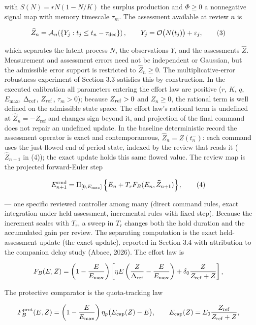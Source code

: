 \documentclass[11pt]{article}
\begin{document}
with \(S(N)=rN(1-N/K)\) the surplus production and \(\Phi\ge 0\) a
nonnegative signal map with memory timescale \(\tau_m\). The assessment
available at review \(n\) is

\[
\widehat Z_n=\mathcal A_n\!\left(\{Y_j:t_j\le t_n-\tau_{\rm dec}\}\right),\qquad
Y_j=\mathcal O\bigl(N(t_j)\bigr)+\varepsilon_j,
\tag{3}
\]

which separates the latent process \(N\), the observations \(Y\), and
the assessments \(\widehat Z\). Measurement and assessment errors need
not be independent or Gaussian, but the admissible error support is
restricted to \(\widehat Z_n \ge 0\). The multiplicative-error
robustness experiment of Section 3.3 satisfies this by construction. In the executed calibration all parameters entering the effort law are positive (\(r\), \(K\), \(q\), \(E_{\max}\), \(\Delta_{\rm ref}\), \(Z_{\rm ref}\), \(\tau_m > 0\)); because \(Z_{\rm ref} > 0\) and \(\widehat Z_n \ge 0\), the rational term is well defined on the admissible state space. The effort law's rational term is undefined at
\(\widehat Z_n = -Z_{\mathrm{ref}}\) and changes sign beyond it, and
projection of the final command does not repair an undefined update. In
the baseline deterministic record the assessment operator is exact and
contemporaneous, \(\widehat Z_n = Z(t_n^-)\): each command uses the just-flowed end-of-period state, indexed by the review that reads it (\(\widehat Z_{n+1}\) in (4)); the exact update holds this same flowed value. The review map is the
projected forward-Euler step

\[
E^{\rm cmd}_{n+1}=\Pi_{[0,E_{\max}]}\left\{E_n+T_rF_B(E_n,\widehat Z_{n+1})\right\},
\tag{4}
\]

--- one specific reviewed controller among many (direct command rules,
exact integration under held assessment, incremental rules with fixed
step). Because the increment scales with \(T_r\), a sweep in \(T_r\)
changes both the hold duration and the accumulated gain per review. The
separating computation is the exact held-assessment update (the exact update), reported in
Section 3.4 with attribution to the companion delay study (Abaee, 2026). The effort law is

\[
F_B(E,Z)=\left(1-\frac{E}{E_{\max}}\right)
\left[
\eta E\left(\frac{Z}{\Delta_{\rm ref}}-\frac{E}{E_{\max}}\right)
+\delta_0\frac{Z}{Z_{\rm ref}+Z}
\right],
\]

The protective comparator is the quota-tracking law

\[
F_B^{\rm prot}(E,Z)=\left(1-\frac{E}{E_{\max}}\right)
\eta_p\bigl(E_{\rm cap}(Z)-E\bigr),
\qquad
E_{\rm cap}(Z)=E_0\frac{Z_{\rm ref}}{Z_{\rm ref}+Z},
\]
\end{document}
